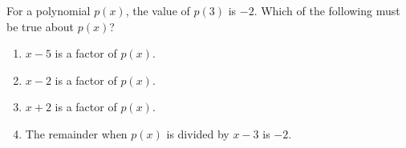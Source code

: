 For a polynomial $p(x)$, the value of $p(3)$ is $-2$. Which of the following must be true about $p(x)$?
\begin{enumerate}
\item[(A)] $x-5$ is a factor of $p(x)$.
\item[(B)] $x-2$ is a factor of $p(x)$.
\item[(C)] $x+2$ is a factor of $p(x)$.
\item[(D)] The remainder when $p(x)$ is divided by $x-3$ is $-2$.
\end{enumerate}
